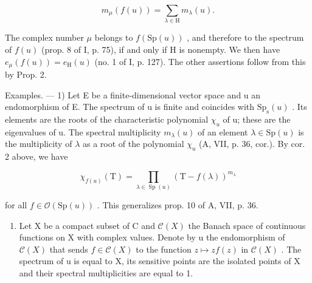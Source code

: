 \[
m _ {\mu} (f (u)) = \sum_ {\lambda \in \mathrm{H}} m _ {\lambda} (u).
\]

The complex number \(\mu\) belongs to \(f(\mathrm{Sp}(u))\) , and therefore to the spectrum of \(f(u)\) (prop. 8 of I, p. 75), if and only if H is nonempty. We then have \(e_{\mu}(f(u)) = e_{\mathrm{H}}(u)\) (no. 1 of I, p. 127). The other assertions follow from this by Prop. 2.

Examples. --- 1) Let E be a finite-dimensional vector space and u an endomorphism of E. The spectrum of u is finite and coincides with \(\mathrm{Sp}_{\mathrm{s}}(u)\) . Its elements are the roots of the characteristic polynomial \(\chi_{u}\) of u; these are the eigenvalues of u. The spectral multiplicity \(m_{\lambda}(u)\) of an element \(\lambda \in \mathrm{Sp}(u)\) is the multiplicity of \(\lambda\) as a root of the polynomial \(\chi_{u}\) (A, VII, p. 36, cor.). By cor. 2 above, we have

\[
\chi_ {f (u)} (\mathrm{T}) = \prod_ {\lambda \in \operatorname{Sp} (u)} (\mathrm{T} - f (\lambda)) ^ {m _ {\lambda}}
\]

for all \(f \in \mathcal{O}(\mathrm{Sp}(u))\) . This generalizes prop. 10 of A, VII, p. 36.

\begin{enumerate}
\def\labelenumi{\arabic{enumi})}
\setcounter{enumi}{1}
\tightlist
\item
  Let X be a compact subset of C and \(\mathcal{C}(X)\) the Banach space of continuous functions on X with complex values. Denote by u the endomorphism of \(\mathcal{C}(X)\) that sends \(f \in \mathcal{C}(X)\) to the function \(z \mapsto zf(z)\) in \(\mathcal{C}(X)\) . The spectrum of u is equal to X, its sensitive points are the isolated points of X and their spectral multiplicities are equal to 1.
\end{enumerate}


